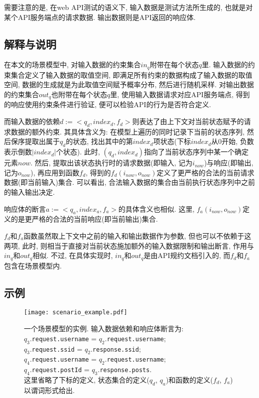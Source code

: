             需要注意的是, 在web API测试的语义下, 输入数据是测试方法所生成的, 也就是对某个API服务端点的请求数据. 输出数据则是API返回的响应体.
        
        \subsection{解释与说明}
            在本文的场景模型中, 对输入数据的约束集合$in_q$附带在每个状态$q$里. 输入数据的约束集合定义了输入数据的取值空间, 即满足所有约束的数据构成了输入数据的取值空间, 数据的生成就是为此取值空间赋予概率分布, 然后进行随机采样. 对输出数据的约束集合$out_q$也附带在每个状态$q$里, 使用输入数据请求对应API服务端点, 得到的响应使用约束条件进行验证, 便可以检验API的行为是否符合定义.
            
            而输入数据的依赖$d := <q_d, index_d, f_d >$则表达了由上下文对当前状态赋予的请求数据的额外约束. 其具体含义为: 在模型上遍历的同时记录下当前的状态序列, 然后保序提取出属于$q_d$的状态, 找出其中的第$index_d$项状态(下标$index_d$从0开始, 负数表示倒数$|index_d|$个状态). 此时, $(q_d, index_d)$指向了当前状态序列中某一个确定元素$now$. 然后, 提取出该状态执行时的请求数据(即输入, 记为$i_{now}$)与响应(即输出, 记为$o_{now}$), 再应用到函数$f_d$, 得到的$f_d(i_{now}, o_{now})$定义了更严格的合法的当前请求数据(即当前输入)集合. 可以看出, 合法输入数据的集合由当前执行状态序列中之前的输入输出决定.
            
            响应体的断言$a := <q_a, index_a, f_a>$的具体含义也相似. 这里, $f_a(i_{now}, o_{now})$定义的是更严格的合法的当前响应(即当前输出)集合.
            
            $f_d$和$f_a$函数虽然取上下文中之前的输入和输出数据作为参数, 但也可以不依赖于这两项, 此时, 则相当于直接对当前状态施加额外的输入数据限制和输出断言, 作用与$in_q$和$out_q$相似. 不过, 在具体实现时, $in_q$和$out_q$是由API规约文档引入的, 而$f_d$和$f_a$包含在场景模型内.
        
        \subsection{示例}
            \begin{figure}
                \centering
                \texttt{[image: scenario\_example.pdf]}
                \caption{一个场景模型的实例. 输入数据依赖和响应体断言为: \\
                $q_3$.\texttt{request.username} = $q_2$.\texttt{request.username};\\
                $q_3$.\texttt{request.ssid} = $q_2$.\texttt{response.ssid};\\
                $q_4$.\texttt{request.username} = $q_2$.\texttt{request.username};\\
                $q_4$.\texttt{request.postId} = $q_3$.\texttt{response.posts}.\\
                这里省略了下标的定义, 状态集合的定义($q_d$, $q_a$)和函数的定义($f_d$, $f_a$)以谓词形式给出.}
                \label{fig:scenario_example}
            \end{figure}
            
